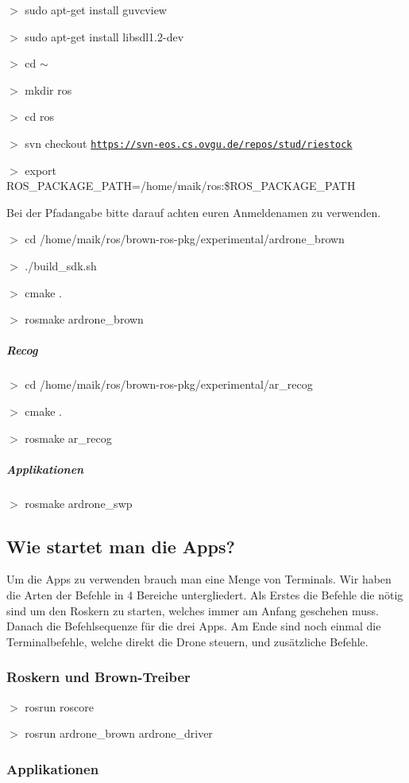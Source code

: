 $>$ sudo apt-\/get install guvcview

$>$ sudo apt-\/get install libsdl1.2-\/dev

$>$ cd $\sim$

$>$ mkdir ros

$>$ cd ros

$>$ svn checkout \href{https://svn-eos.cs.ovgu.de/repos/stud/riestock}{\tt https://svn-\/eos.cs.ovgu.de/repos/stud/riestock}

$>$ export ROS\_\-PACKAGE\_\-PATH=/home/maik/ros:\$ROS\_\-PACKAGE\_\-PATH

Bei der Pfadangabe bitte darauf achten euren Anmeldenamen zu verwenden.

$>$ cd /home/maik/ros/brown-\/ros-\/pkg/experimental/ardrone\_\-brown

$>$ ./build\_\-sdk.sh

$>$ cmake .

$>$ rosmake ardrone\_\-brown

\subparagraph*{Recog }

$>$ cd /home/maik/ros/brown-\/ros-\/pkg/experimental/ar\_\-recog

$>$ cmake .

$>$ rosmake ar\_\-recog

\subparagraph*{Applikationen }

$>$ rosmake ardrone\_\-swp

\subsection*{Wie startet man die Apps? }

Um die Apps zu verwenden brauch man eine Menge von Terminals. Wir haben die Arten der Befehle in 4 Bereiche untergliedert. Als Erstes die Befehle die nötig sind um den Roskern zu starten, welches immer am Anfang geschehen muss. Danach die Befehlsequenze für die drei Apps. Am Ende sind noch einmal die Terminalbefehle, welche direkt die Drone steuern, und zusätzliche Befehle.

\subsubsection*{Roskern und Brown-\/Treiber }

$>$ rosrun roscore

$>$ rosrun ardrone\_\-brown ardrone\_\-driver

\subsubsection*{Applikationen }

